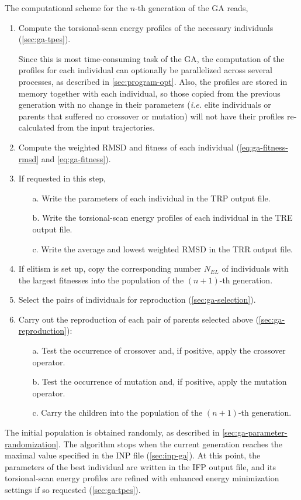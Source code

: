 \documentclass[10pt,a4paper]{report}
\numberwithin{equation}{section}
\newcommand{\revyan}[1]{{\color{red}{[#1]}}}
\begin{document}
The computational scheme for the $n$-th generation of the GA reads,
\begin{enumerate}
\item Compute the torsional-scan energy profiles of the necessary individuals (\autoref{sec:ga-tpes}).
  \par
  Since this is most time-consuming task of the GA, the computation of
  the profiles for each individual can optionally be parallelized
  across several processes, as described in
  \autoref{sec:program-opt}. Also, the profiles are stored in memory
  together with each individual, so those copied from the previous
  generation with no change in their parameters (\textit{i.e.} elite
  individuals or parents that suffered no crossover or mutation) will
  not have their profiles re-calculated from the input trajectories.

\item Compute the weighted RMSD and fitness of each individual
  (\autoref{eq:ga-fitness-rmsd} and \autoref{eq:ga-fitness}).
\item If requested in this step,
  \begin{enumerate}
  \item[a.]  Write the parameters of each individual in the TRP output file.
  \item [b.] Write the torsional-scan energy profiles of each individual in the TRE output file.
  \item [c.] Write the average and lowest weighted RMSD in the TRR output file.
  \end{enumerate}
\item If elitism is set up, copy the corresponding number $N_{EL}$ of individuals  with the largest fitnesses into the population of the $(n+1)$-th generation.
\item Select the pairs of individuals for reproduction (\autoref{sec:ga-selection}).
\item Carry out the reproduction of each pair of parents selected above (\autoref{sec:ga-reproduction}):
  \begin{enumerate}
  \item[a.] Test the occurrence of crossover and, if positive, apply the crossover operator.
  \item[b.] Test the occurrence of mutation and, if positive, apply the mutation operator.
  \item[c.] Carry the children into the population of the $(n+1)$-th generation.
  \end{enumerate}
\end{enumerate}
The initial population is obtained randomly, as described in \autoref{sec:ga-parameter-randomization}.
The algorithm stops when the current generation reaches the maximal value specified in the INP file (\autoref{sec:inp-ga}).
At this point, the parameters of the best individual are written in the IFP output file, and its torsional-scan energy profiles are refined with enhanced energy minimization settings if so requested (\autoref{sec:ga-tpes}).
\end{document}
